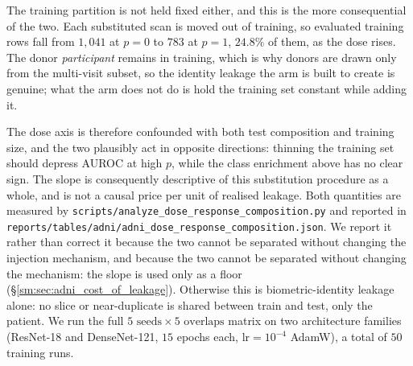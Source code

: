 \documentclass[11pt]{article}
\providecommand{\pb}{\discretionary{}{}{}}
\begin{document}
The training partition is not held fixed either, and this is the more
consequential of the two. Each substituted scan is moved out of training,
so evaluated training rows fall from $1{,}041$ at $p=0$ to $783$ at
$p=1$, $24.8\%$ of them, as the dose rises. The donor
\emph{participant} remains in training, which is why donors are drawn only
from the multi-visit subset, so the identity leakage the arm is built to
create is genuine; what the arm does not do is hold the training set
constant while adding it.

The dose axis is therefore confounded with both test composition and
training size, and the two plausibly act in opposite directions: thinning
the training set should depress AUROC at high $p$, while the class
enrichment above has no clear sign. The slope is consequently descriptive
of this substitution procedure as a whole, and is not a causal price per
unit of realised leakage. Both quantities are measured by
\texttt{scripts/\pb analyze\_dose\_response\_composition.py} and reported in
\texttt{reports/\pb tables/\pb adni/\pb adni\_dose\_response\_composition.json}. We report it rather than correct it
because the two cannot be separated without changing the injection
mechanism, and because the two cannot be separated without changing the
mechanism: the slope is used only as a floor
(\S\ref{sm:sec:adni_cost_of_leakage}). Otherwise this is biometric-identity
leakage alone: no slice or near-duplicate is shared between train and
test, only the patient. We run the full $5\text{ seeds} \times 5\text{ overlaps}$
matrix on two architecture families (ResNet-18 and DenseNet-121,
$15$ epochs each, $\mathrm{lr}=10^{-4}$ AdamW), a total of $50$
training runs.
\end{document}
